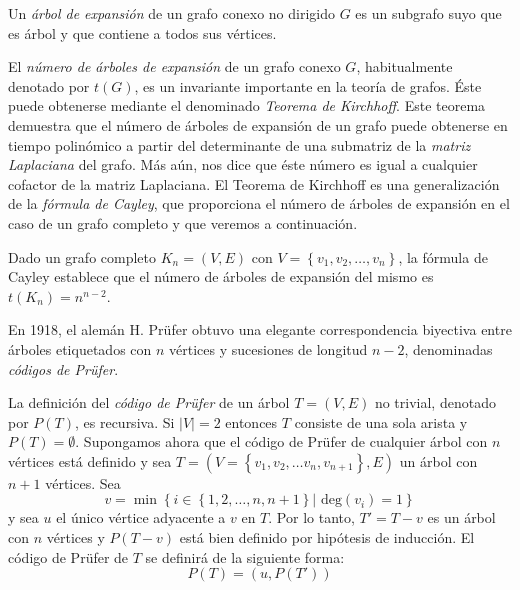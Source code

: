 \begin{definition}
Un \emph{árbol de expansión} de un grafo conexo no dirigido $G$ es un subgrafo suyo que es árbol y que contiene a todos sus vértices.

El \emph{número de árboles de expansión} de un grafo conexo $G$, habitualmente denotado por $t(G)$, es un invariante importante en la teoría de grafos. Éste puede obtenerse mediante el denominado \emph{Teorema de Kirchhoff}. Este teorema demuestra que el número de árboles de expansión de un grafo puede obtenerse en tiempo polinómico a partir del determinante de una submatriz de la \emph{matriz Laplaciana} del grafo. Más aún, nos dice que éste número es igual a cualquier cofactor de la matriz Laplaciana. El Teorema de Kirchhoff es una generalización de la \emph{fórmula de Cayley}, que proporciona el número de árboles de expansión en el caso de un grafo completo y que veremos a continuación.
\end{definition}

\begin{proposition}\label{prop:1}
Dado un grafo completo $K_n = (V,E)$ con $V=\left\lbrace v_1,v_2,\dots,v_n\right\rbrace$, la fórmula de Cayley establece que el número de árboles de expansión del mismo es $t(K_n) = n^{n-2}$.
\end{proposition}

En 1918, el alemán H. Prüfer obtuvo una elegante correspondencia biyectiva entre árboles etiquetados con $n$ vértices y sucesiones de longitud $n-2$, denominadas \emph{códigos de Prüfer}.

\begin{definition}
La definición del \emph{código de Prüfer} de un árbol $T = (V,E)$ no trivial, denotado por $P(T)$, es recursiva. Si $|V| = 2$ entonces $T$ consiste de una sola arista y $P(T) = \emptyset$. Supongamos ahora que el código de Prüfer de cualquier árbol con $n$ vértices está definido  y sea $T = (V = \left\lbrace v_1, v_2,\dots v_n, v_{n+1} \right\rbrace,E)$ un árbol con $n+1$ vértices. Sea
\begin{equation}
v = \min \left\lbrace i \in \left\lbrace 1,2,\dots,n,n+1 \right\rbrace | \text{ deg}(v_i) = 1\right\rbrace
\end{equation}
y sea $u$ el único vértice adyacente a $v$ en $T$. Por lo tanto, $T' = T - v$ es un árbol con $n$ vértices y $P(T-v)$ está bien definido por hipótesis de inducción. El código de Prüfer de $T$ se definirá de la siguiente forma:
\begin{equation}
P(T) = (u,P(T'))
\end{equation}
\end{definition}

